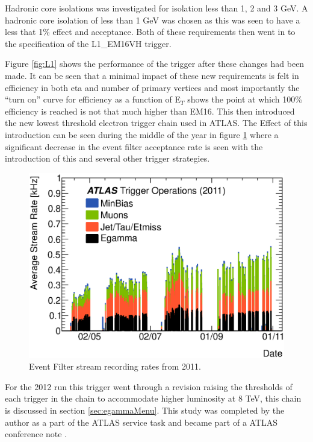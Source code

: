 		Hadronic core isolations was investigated for isolation less than 1, 2 and 3 GeV. A hadronic core isolation of less than 1 GeV was chosen as this was seen to have a less that 1\% effect and acceptance. Both of these requirements then went in to the specification of the L1\_EM16VH trigger.


		Figure \ref{fig:L1} shows the performance of the trigger after these changes had been made. It can be seen that a minimal impact of these new requirements is felt in efficiency in both eta and number of primary vertices and most importantly the ``turn on'' curve for efficiency as a function of E$_{T}$ shows the point at which 100\% efficiency is reached is not that much higher than EM16. This then introduced the new lowest threshold electron trigger chain used in ATLAS. The Effect of this introduction can be seen during the middle of the year in figure \ref{fig:EF_rate} where a significant decrease in the event filter acceptance rate is seen with the introduction of this and several other trigger strategies. 


		\begin{figure}[h!]
			\centering
				\includegraphics[width=0.8\linewidth]{images/2011_streams_quarter_day.eps}
			\caption{Event Filter stream recording rates from 2011. \cite{Trigger_op_2011}}
			\label{fig:EF_rate}
		\end{figure}


		For the 2012 run this trigger went through a revision raising the thresholds of each trigger in the chain to accommodate higher luminosity at 8 TeV, this chain is discussed in section \ref{sec:egammaMenu}. This study was completed by the author as a part of the ATLAS service task and became part of a ATLAS conference note \cite{ATLAS-CONF-2012-048}.


